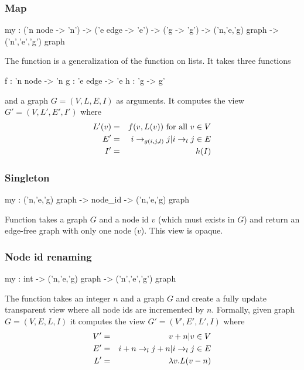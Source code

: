 \subsubsection{Map}
\begin{SML}
   my  :
     ('n node -> 'n') -> ('e edge -> 'e') -> ('g -> 'g') -> 
     ('n,'e,'g) graph -> ('n','e','g') graph
\end{SML}
The function  is a generalization of the 
function on lists.  It takes three functions 
\begin{SML}
f : 'n node -> 'n
g : 'e edge -> 'e
h : 'g -> g'
\end{SML}
and a graph $G=(V,L,E,I)$ as arguments.  
It computes the view $G'=(V,L',E',I')$ where
\begin{eqnarray*}
  L'(v) & = & f(v,L(v)) \mbox{\ for all $v \in V$} \\
  E'    & = & { i \rightarrow_{g(i,j,l)} j | i \rightarrow_{l} j \in E } \\
  I'    & = & h(I) 
\end{eqnarray*}

\subsubsection{Singleton}
\begin{SML}
   my  : ('n,'e,'g) graph -> node_id -> ('n,'e,'g) graph
\end{SML}
Function  
takes a graph $G$ and a node id $v$ (which must exists in $G$)
and return an edge-free graph with only one node ($v$).
This view is opaque.

\subsubsection{Node id renaming}
\begin{SML}
   my  : int -> ('n,'e,'g) graph -> ('n','e','g') graph
\end{SML}
The function  takes an integer $n$ and
a graph $G$ and create a fully update transparent
view where all node ids are incremented by $n$.  Formally,
given graph $G=(V,E,L,I)$ it computes the view $G'=(V',E',L',I)$
where
\begin{eqnarray*}
   V' & = & { v + n | v \in V } \\
   E' & = & { i+n \rightarrow_{l} j+n | i \rightarrow_{l} j \in E } \\
   L' & = & \lambda v. L(v-n) 
\end{eqnarray*}


